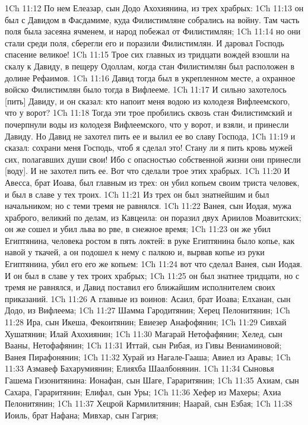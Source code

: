1Ch 11:12  По нем Елеазар, сын Додо Ахохиянина, из трех храбрых:
1Ch 11:13  он был с Давидом в Фасдамиме, куда Филистимляне собрались на войну. Там часть поля была засеяна ячменем, и народ побежал от Филистимлян;
1Ch 11:14  но они стали среди поля, сберегли его и поразили Филистимлян. И даровал Господь спасение великое!
1Ch 11:15  Трое сих главных из тридцати вождей взошли на скалу к Давиду, в пещеру Одоллам, когда стан Филистимлян был расположен в долине Рефаимов.
1Ch 11:16  Давид тогда был в укрепленном месте, а охранное войско Филистимлян было тогда в Вифлееме.
1Ch 11:17  И сильно захотелось [пить] Давиду, и он сказал: кто напоит меня водою из колодезя Вифлеемского, что у ворот?
1Ch 11:18  Тогда эти трое пробились сквозь стан Филистимский и почерпнули воды из колодезя Вифлеемского, что у ворот, и взяли, и принесли Давиду. Но Давид не захотел пить ее и вылил ее во славу Господа,
1Ch 11:19  и сказал: сохрани меня Господь, чтоб я сделал это! Стану ли я пить кровь мужей сих, полагавших души свои! Ибо с опасностью собственной жизни они принесли [воду]. И не захотел пить ее. Вот что сделали трое этих храбрых.
1Ch 11:20  И Авесса, брат Иоава, был главным из трех: он убил копьем своим триста человек, и был в славе у тех троих.
1Ch 11:21  Из трех он был знатнейшим и был начальником; но с теми тремя не равнялся.
1Ch 11:22  Ванея, сын Иодая, мужа храброго, великий по делам, из Кавцеила: он поразил двух Ариилов Моавитских; он же сошел и убил льва во рве, в снежное время;
1Ch 11:23  он же убил Египтянина, человека ростом в пять локтей: в руке Египтянина было копье, как навой у ткачей, а он подошел к нему с палкою и, вырвав копье из руки Египтянина, убил его его же копьем:
1Ch 11:24  вот что сделал Ванея, сын Иодая. И он был в славе у тех троих храбрых;
1Ch 11:25  он был знатнее тридцати, но с тремя не равнялся, и Давид поставил его ближайшим исполнителем своих приказаний.
1Ch 11:26  А главные из воинов: Асаил, брат Иоава; Елханан, сын Додо, из Вифлеема;
1Ch 11:27  Шамма Гародитянин; Херец Пелонитянин;
1Ch 11:28  Ира, сын Икеша, Фекоитянин; Евиезер Анафофянин;
1Ch 11:29  Сивхай Хушатянин; Илай Ахохиянин;
1Ch 11:30  Магарай Нетофафянин; Хелед, сын Вааны, Нетофафянин;
1Ch 11:31  Иттай, сын Рибая, из Гивы Вениаминовой; Ванея Пирафонянин;
1Ch 11:32  Хурай из Нагале-Гааша; Авиел из Аравы;
1Ch 11:33  Азмавеф Бахарумиянин; Елияхба Шаалбонянин.
1Ch 11:34  Сыновья Гашема Гизонитянина: Ионафан, сын Шаге, Гараритянин;
1Ch 11:35  Ахиам, сын Сахара, Гараритянин; Елифал, сын Уры;
1Ch 11:36  Хефер из Махеры; Ахиа Пелонитянин;
1Ch 11:37  Хецрой Кармилитянин; Наарай, сын Езбая;
1Ch 11:38  Иоиль, брат Нафана; Мивхар, сын Гагрия;
